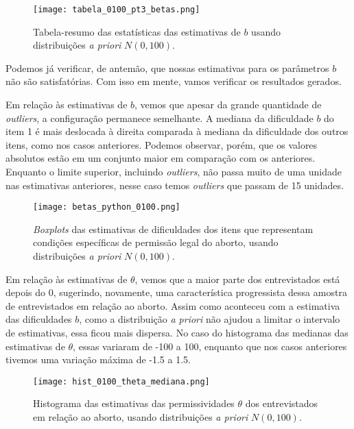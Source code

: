 \documentclass[
	12pt,				%
	openright,			%
	twoside,			%
	a4paper,			%
	english,			%
	brazil				%
	]{abntex2}
\begin{document}
 \begin{figure}[!htbp]
    \centering
    \texttt{[image: tabela\_0100\_pt3\_betas.png]}
    \caption{Tabela-resumo das estatísticas das estimativas de $b$ usando distribuições \textit{a priori} $N(0, 100)$.}
    \label{fig:tabela0100beta}
 \end{figure}
 
 Podemos já verificar, de antemão, que nossas estimativas para os parâmetros $b$ não são satisfatórias. Com isso em mente, vamos verificar os resultados gerados.
 
 Em relação às estimativas de $b$, vemos que apesar da grande quantidade de \textit{outliers}, a configuração permanece semelhante. A mediana da dificuldade $b$ do item 1 é mais deslocada à direita comparada à mediana da dificuldade dos outros itens, como nos casos anteriores. Podemos observar, porém, que os valores absolutos estão em um conjunto maior em comparação com os anteriores. Enquanto o limite superior, incluindo \textit{outliers}, não passa muito de uma unidade nas estimativas anteriores, nesse caso temos \textit{outliers} que passam de 15 unidades.
 
 \begin{figure}[!htbp]
    \centering
    \texttt{[image: betas\_python\_0100.png]}
    \caption{\textit{Boxplots} das estimativas de dificuldades dos itens que representam condições específicas de permissão legal do aborto, usando distribuições \textit{a priori} $N(0, 100)$.}
    \label{fig:betas01}
 \end{figure}
 
 Em relação às estimativas de $\theta$, vemos que a maior parte dos entrevistados está depois do 0, sugerindo, novamente, uma característica progressista dessa amostra de entrevistados em relação ao aborto. Assim como aconteceu com a estimativa das dificuldades $b$, como a distribuição \textit{a priori} não ajudou a limitar o intervalo de estimativas, essa ficou mais dispersa. No caso do histograma das medianas das estimativas de $\theta$, essas variaram de -100 a 100, enquanto que nos casos anteriores tivemos uma variação máxima de -1.5 a 1.5.
 
 \begin{figure}[!htbp]
    \centering
    \texttt{[image: hist\_0100\_theta\_mediana.png]}
    \caption{Histograma das estimativas das permissividades $\theta$ dos entrevistados em relação ao aborto, usando distribuições \textit{a priori} $N(0, 100)$.}
    \label{fig:thetas01}
 \end{figure}
 
\end{document}
